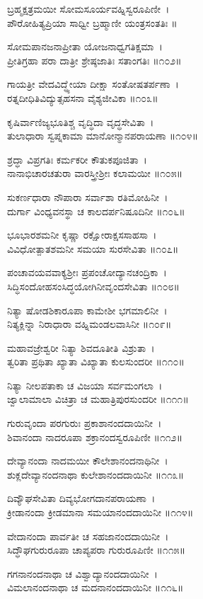 ಬ್ರಹ್ಮಕ್ಷತ್ರಮಯೀ ಸೋಮಸೂರ್ಯವಹ್ನಿಸ್ವರೂಪಿಣೀ~।\\
ಪೌರೋಹಿತ್ಯಪ್ರಿಯಾ ಸಾಧ್ವೀ ಬ್ರಹ್ಮಾಣೀ ಯಂತ್ರಸಂತತಿಃ ॥

	ಸೋಮಪಾನಜನಾಪ್ರೀತಾ ಯೋಜನಾಧ್ವಗತಿಕ್ಷಮಾ~।\\
	ಪ್ರೀತಿಗ್ರಹಾ ಪರಾ ದಾತ್ರೀ ಶ್ರೇಷ್ಠಜಾತಿಃ ಸತಾಂಗತಿಃ ॥೧೦೨॥

ಗಾಯತ್ರೀ ವೇದವಿದ್ಧ್ಯೇಯಾ ದೀಕ್ಷಾ ಸಂತೋಷತರ್ಪಣಾ~।\\
ರತ್ನದೀಧಿತಿವಿದ್ಯುತ್ಸಹಸನಾ ವೈಶ್ಯಜೀವಿಕಾ ॥೧೦೩॥

	ಕೃಷಿರ್ವಾಣಿಜ್ಯಭೂತಿಶ್ಚ ವೃದ್ಧಿದಾ ವೃದ್ಧಸೇವಿತಾ~।\\
	ತುಲಾಧಾರಾ ಸ್ವಪ್ನಕಾಮಾ ಮಾನೋನ್ಮಾನಪರಾಯಣಾ ॥೧೦೪॥

ಶ್ರದ್ಧಾ ವಿಪ್ರಗತಿಃ ಕರ್ಮಕರೀ ಕೌತುಕಪೂಜಿತಾ~।\\
ನಾನಾಭಿಚಾರಚತುರಾ ವಾರಸ್ತ್ರೀಶ್ರೀಃ ಕಲಾಮಯೀ ॥೧೦೫॥

	ಸುಕರ್ಣಧಾರಾ ನೌಪಾರಾ ಸರ್ವಾಶಾ ರತಿಮೋಹಿನೀ~।\\
	ದುರ್ಗಾ ವಿಂಧ್ಯವನಸ್ಥಾ ಚ ಕಾಲದರ್ಪನಿಷೂದಿನೀ ॥೧೦೬॥

ಭೂಭಾರಶಮನೀ ಕೃಷ್ಣಾ ರಕ್ಷೋರಾಕ್ಷಸಸಾಹಸಾ~।\\
ವಿವಿಧೋತ್ಪಾತಶಮನೀ ಸಮಯಾ ಸುರಸೇವಿತಾ ॥೧೦೭॥

	ಪಂಚಾವಯವವಾಕ್ಯಶ್ರೀಃ ಪ್ರಪಂಚೋದ್ಯಾನಚಂದ್ರಿಕಾ~।\\
	ಸಿದ್ಧಿಸಂದೋಹಸಂಸಿದ್ಧಯೋಗಿನೀವೃಂದಸೇವಿತಾ ॥೧೦೮॥

ನಿತ್ಯಾ ಷೋಡಶಿಕಾರೂಪಾ ಕಾಮೇಶೀ ಭಗಮಾಲಿನೀ~।\\
ನಿತ್ಯಕ್ಲಿನ್ನಾ ನಿರಾಧಾರಾ ವಹ್ನಿಮಂಡಲವಾಸಿನೀ ॥೧೦೯॥

	ಮಹಾವಜ್ರೇಶ್ವರೀ ನಿತ್ಯಾ ಶಿವದೂತೀತಿ ವಿಶ್ರುತಾ~।\\
	ತ್ವರಿತಾ ಪ್ರಥಿತಾ ಖ್ಯಾತಾ ವಿಖ್ಯಾತಾ ಕುಲಸುಂದರೀ ॥೧೧೦॥

ನಿತ್ಯಾ ನೀಲಪತಾಕಾ ಚ ವಿಜಯಾ ಸರ್ವಮಂಗಲಾ~।\\
ಜ್ವಾಲಾಮಾಲಾ ವಿಚಿತ್ರಾ ಚ ಮಹಾತ್ರಿಪುರಸುಂದರೀ ॥೧೧೧॥

	ಗುರುವೃಂದಾ ಪರಗುರುಃ ಪ್ರಕಾಶಾನಂದದಾಯಿನೀ~।\\
	ಶಿವಾನಂದಾ ನಾದರೂಪಾ ಶಕ್ರಾನಂದಸ್ವರೂಪಿಣೀ ॥೧೧೨॥

ದೇವ್ಯಾನಂದಾ ನಾದಮಯೀ ಕೌಲೇಶಾನಂದನಾಥಿನೀ~।\\
ಶುಕ್ಲದೇವ್ಯಾನಂದನಾಥಾ ಕುಲೇಶಾನಂದದಾಯಿನೀ ॥೧೧೩॥

	ದಿವ್ಯೌಘಸೇವಿತಾ ದಿವ್ಯಭೋಗದಾನಪರಾಯಣಾ~।\\
	ಕ್ರೀಡಾನಂದಾ ಕ್ರೀಡಮಾನಾ ಸಮಯಾನಂದದಾಯಿನೀ ॥೧೧೪॥

ವೇದಾನಂದಾ ಪಾರ್ವತೀ ಚ ಸಹಜಾನಂದದಾಯಿನೀ~।\\
ಸಿದ್ಧೌಘಗುರುರೂಪಾ ಚಾಪ್ಯಪರಾ ಗುರುರೂಪಿಣೀ ॥೧೧೫॥

	ಗಗನಾನಂದನಾಥಾ ಚ ವಿಶ್ವಾದ್ಯಾನಂದದಾಯಿನೀ~।\\
	ವಿಮಲಾನಂದನಾಥಾ ಚ ಮದನಾನಂದದಾಯಿನೀ ॥೧೧೬॥

